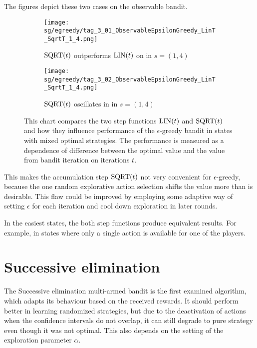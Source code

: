 \documentclass[../main.tex]{subfiles}
\begin{document}
The figures  depict these two cases on the observable bandit.
\begin{figure}[ht]
    \begin{subfigure}[t]{0.45\linewidth}
        \texttt{[image: sg/egreedy/tag\_3\_01\_ObservableEpsilonGreedy\_LinT\_SqrtT\_1\_4.png]}
        \caption{$\sqrtt$ outperforms $\lint$ on  in $s = \left(1, 4\right)$}
        \label{apx:sgexp:eps:fig:sqrt:outperforms}
    \end{subfigure}
    \hfill
    \begin{subfigure}[t]{0.45\linewidth}
        \texttt{[image: sg/egreedy/tag\_3\_02\_ObservableEpsilonGreedy\_LinT\_SqrtT\_1\_4.png]}
        \caption{$\sqrtt$ oscillates in  in $s = \left(1, 4\right)$}
        \label{apx:sgexp:eps:fig:sqrt:oscilates}
    \end{subfigure}
    \caption[Comparison of $\lint$ and $\sqrtt$ in combination with $\epsilon$-greedy bandit]{
        This chart compares the two step functions $\lint$ and $\sqrtt$ and how they influence performance of the $\epsilon$-greedy bandit in states with mixed optimal strategies.
        The performance is measured as a dependence of difference between the optimal value and the value from bandit iteration on iterations $t$.
    }
    \label{apx:sgexp:eps:fig:sqrt}
\end{figure}

This makes the accumulation step $\sqrtt$ not very convenient for $\epsilon$-greedy, because the one random explorative action selection shifts the value more than is desirable.
This flaw could be improved by employing some adaptive way of setting $\epsilon$ for each iteration and cool down exploration in later rounds.

In the easiest states, the both step functions produce equivalent results.
For example, in states where only a single action is available for one of the players.

\section{Successive elimination}\label{apx:sgexp:succ}
The Successive elimination multi-armed bandit is the first examined algorithm, which adapts its behaviour based on the received rewards.
It should perform better in learning randomized strategies, but due to the deactivation of actions when the confidence intervals do not overlap, it can still degrade to pure strategy even though it was not optimal.
This also depends on the setting of the exploration parameter $\alpha$.
\end{document}
